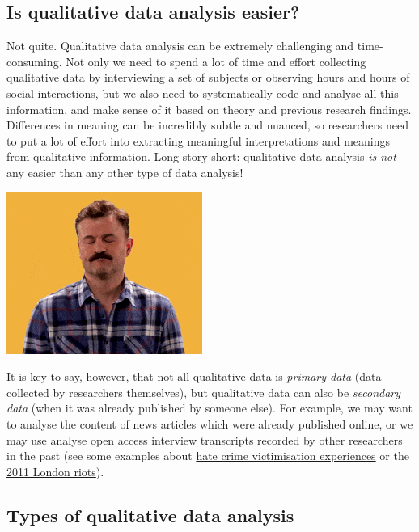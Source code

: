 \documentclass[
]{book}
\begin{document}
\hypertarget{is-qualitative-data-analysis-easier}{%
\subsection{Is qualitative data analysis easier?}\label{is-qualitative-data-analysis-easier}}

Not quite. Qualitative data analysis can be extremely challenging and time-consuming. Not only we need to spend a lot of time and effort collecting qualitative data by interviewing a set of subjects or observing hours and hours of social interactions, but we also need to systematically code and analyse all this information, and make sense of it based on theory and previous research findings. Differences in meaning can be incredibly subtle and nuanced, so researchers need to put a lot of effort into extracting meaningful interpretations and meanings from qualitative information. Long story short: qualitative data analysis \emph{is not} any easier than any other type of data analysis!

\includegraphics{imgs/disappointed.gif}

It is key to say, however, that not all qualitative data is \emph{primary data} (data collected by researchers themselves), but qualitative data can also be \emph{secondary data} (when it was already published by someone else). For example, we may want to analyse the content of news articles which were already published online, or we may use analyse open access interview transcripts recorded by other researchers in the past (see some examples about \href{https://reshare.ukdataservice.ac.uk/851570/}{hate crime victimisation experiences} or the \href{https://reshare.ukdataservice.ac.uk/853792/}{2011 London riots}).

\hypertarget{types-of-qualitative-data-analysis}{%
\subsection{Types of qualitative data analysis}\label{types-of-qualitative-data-analysis}}
\end{document}

